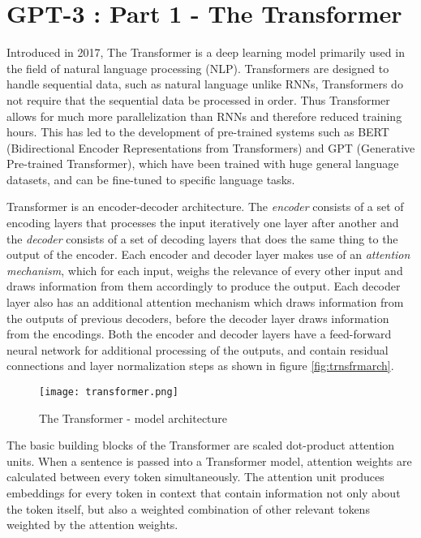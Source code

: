 \chapter*{GPT-3 : Part 1 - The Transformer}
\label{chap:transformer}
\thispagestyle{fancy}

\hspace{0.5cm} Introduced in 2017, The Transformer is a deep learning model primarily used in the field of natural language processing (NLP). Transformers are designed to handle sequential data, such as natural language unlike RNNs, Transformers do not require that the sequential data be processed in order. Thus Transformer allows for much more parallelization than RNNs and therefore reduced training hours. This has led to the development of pre-trained systems such as BERT (Bidirectional Encoder Representations from Transformers) and GPT (Generative Pre-trained Transformer), which have been trained with huge general language datasets, and can be fine-tuned to specific language tasks.

Transformer is an encoder-decoder architecture. The \emph{encoder} consists of a set of encoding layers that processes the input iteratively one layer after another and the \emph{decoder} consists of a set of decoding layers that does the same thing to the output of the encoder. Each encoder and decoder layer makes use of an \emph{attention mechanism}, which for each input, weighs the relevance of every other input and draws information from them accordingly to produce the output. Each decoder layer also has an additional attention mechanism which draws information from the outputs of previous decoders, before the decoder layer draws information from the encodings. Both the encoder and decoder layers have a feed-forward neural network for additional processing of the outputs, and contain residual connections and layer normalization steps \cite{wiki:transformer} as shown in figure \eqref{fig:trnsfrmarch}.

\begin{figure}[!htbp]
    \centering
    \texttt{[image: transformer.png]}
    \caption[The Transformer - model architecture]{The Transformer - model architecture \cite{2017arXiv170603762V}}
    \label{fig:trnsfrmarch}
\end{figure}

The basic building blocks of the Transformer are scaled dot-product attention units. When a sentence is passed into a Transformer model, attention weights are calculated between every token simultaneously. The attention unit produces embeddings for every token in context that contain information not only about the token itself, but also a weighted combination of other relevant tokens weighted by the attention weights.

